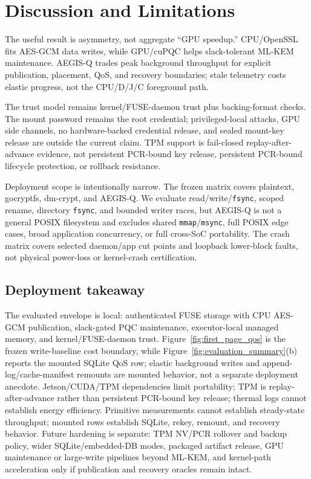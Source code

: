 \section{Discussion and Limitations}
\label{sec:discussion}

The useful result is asymmetry, not aggregate ``GPU speedup.''  CPU/OpenSSL fits AES-GCM data writes, while GPU/cuPQC helps slack-tolerant ML-KEM maintenance.  AEGIS-Q trades peak background throughput for explicit publication, placement, QoS, and recovery boundaries; stale telemetry costs elastic progress, not the CPU/D/J/C foreground path.

The trust model remains kernel/FUSE-daemon trust plus backing-format checks.  The mount password remains the root credential; privileged-local attacks, GPU side channels, no hardware-backed credential release, and sealed mount-key release are outside the current claim.  TPM support is fail-closed replay-after-advance evidence, not persistent PCR-bound key release, persistent PCR-bound lifecycle protection, or rollback resistance.

Deployment scope is intentionally narrow.  The frozen matrix covers plaintext, gocryptfs, dm-crypt, and AEGIS-Q.  We evaluate read/write/\texttt{fsync}, scoped rename, directory \texttt{fsync}, and bounded writer races, but AEGIS-Q is not a general POSIX filesystem and excludes shared \texttt{mmap}/\texttt{msync}, full POSIX edge cases, broad application concurrency, or full cross-SoC portability.  The crash matrix covers selected daemon/app cut points and loopback lower-block faults, not physical power-loss or kernel-crash certification.

\subsection{Deployment takeaway}
The evaluated envelope is local: authenticated FUSE storage with CPU AES-GCM publication, slack-gated PQC maintenance, executor-local managed memory, and kernel/FUSE-daemon trust.  Figure~\ref{fig:first_page_qos} is the frozen write-baseline cost boundary, while Figure~\ref{fig:evaluation_summary}(b) reports the mounted SQLite QoS row; elastic background writes and append-log/cache-manifest remounts are mounted behavior, not a separate deployment anecdote.  Jetson/CUDA/TPM dependencies limit portability; TPM is replay-after-advance rather than persistent PCR-bound key release; thermal logs cannot establish energy efficiency.  Primitive measurements cannot establish steady-state throughput; mounted rows establish SQLite, rekey, remount, and recovery behavior.  Future hardening is separate: TPM NV/PCR rollover and backup policy, wider SQLite/embedded-DB modes, packaged artifact release, GPU maintenance or large-write pipelines beyond ML-KEM, and kernel-path acceleration only if publication and recovery oracles remain intact.
